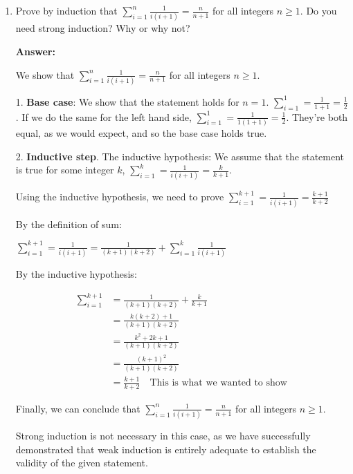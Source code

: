 \documentclass[11pt]{article}
\begin{document}
\begin{enumerate}
\begin{enumerate}
\item Prove by induction that $\sum_{i=1}^n \frac{1}{i(i+1)} =
  \frac{n}{n+1}$ for all integers $n \geq 1$.  Do you need strong
  induction?  Why or why not?

  \textbf{Answer:}

  We show that  $\sum_{i=1}^n \frac{1}{i(i+1)} =
  \frac{n}{n+1}$ for all integers $n \geq 1$.

  1. \textbf{Base case}: We show that the statement holds for $n=1$.
  $\sum_{i=1}^1=\frac{1}{1+1}=\frac{1}{2}$. If we do the same for the left hand side, $\sum_{i=1}^1 = \frac{1}{1(1+1)}=\frac{1}{2}$. They're both equal, as we would expect, and so the base case holds true.
  
  2. \textbf{Inductive step}.
    The inductive hypothesis: We assume that the statement is true for some integer $k$, $\sum_{i=1}^k=\frac{1}{i(i+1)}=\frac{k}{k+1}$.
    
    Using the inductive hypothesis, we need to prove $\sum_{i=1}^{k+1}=\frac{1}{i(i+1)}=\frac{k+1}{k+2}$

    By the definition of sum:

    $\sum_{i=1}^{k+1}=\frac{1}{i(i+1)}=\frac{1}{(k+1)(k+2)}+\sum_{i=1}^k\frac{1}{i(i+1)}$

    By the inductive hypothesis:

    \begin{align*}
        \sum_{i=1}^{k+1} &= \frac{1}{(k+1)(k+2)}+\frac{k}{k+1} \\
        &= \frac{k(k+2)+1}{(k+1)(k+2)} \\
        &= \frac{k^2+2k+1}{(k+1)(k+2)} \\
        &= \frac{(k+1)^2}{(k+1)(k+2)} \\
        &= \frac{k+1}{k+2} \quad \text{This is what we wanted to show}
    \end{align*}

    Finally, we can conclude that $\sum_{i=1}^n \frac{1}{i(i+1)} =
  \frac{n}{n+1}$ for all integers $n \geq 1$.

  Strong induction is not necessary in this case, as we have successfully demonstrated that weak induction is entirely adequate to establish the validity of the given statement.
    
    
    
\end{enumerate}


\end{enumerate}

\vspace*{.4cm}
\end{document}
